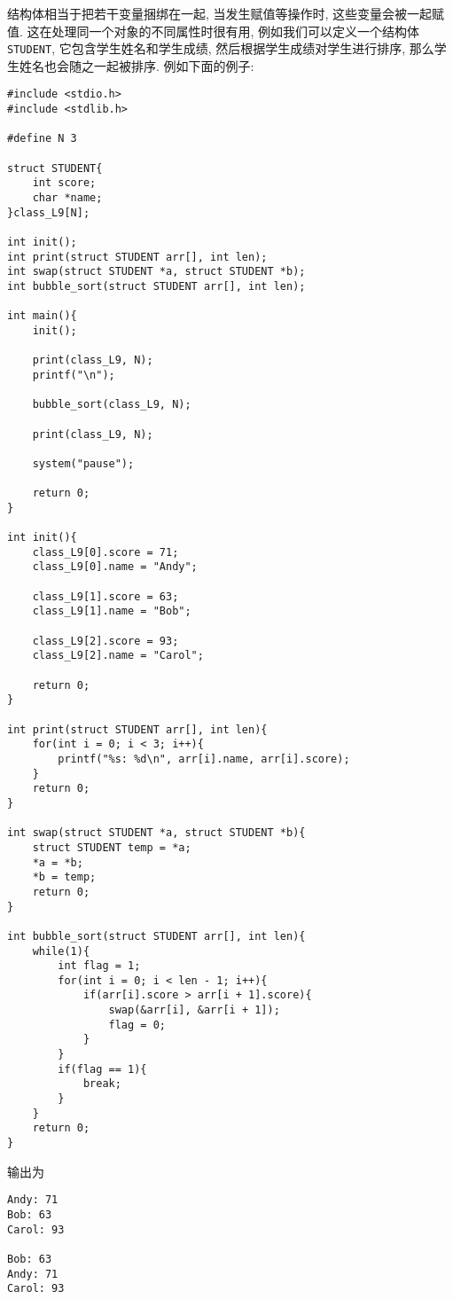     结构体相当于把若干变量捆绑在一起, 当发生赋值等操作时, 这些变量会被一起赋值. 这在处理同一个对象的不同属性时很有用, 例如我们可以定义一个结构体\texttt{STUDENT}, 它包含学生姓名和学生成绩, 然后根据学生成绩对学生进行排序, 那么学生姓名也会随之一起被排序. 例如下面的例子:
\begin{lstlisting}
#include <stdio.h>
#include <stdlib.h>

#define N 3

struct STUDENT{
    int score;
    char *name;
}class_L9[N];

int init();
int print(struct STUDENT arr[], int len);
int swap(struct STUDENT *a, struct STUDENT *b);
int bubble_sort(struct STUDENT arr[], int len);

int main(){
    init();

    print(class_L9, N);
    printf("\n");

    bubble_sort(class_L9, N);

    print(class_L9, N);

    system("pause");

    return 0;
}

int init(){
    class_L9[0].score = 71;
    class_L9[0].name = "Andy";

    class_L9[1].score = 63;
    class_L9[1].name = "Bob";

    class_L9[2].score = 93;
    class_L9[2].name = "Carol";

    return 0;
}

int print(struct STUDENT arr[], int len){
    for(int i = 0; i < 3; i++){
        printf("%s: %d\n", arr[i].name, arr[i].score);
    }
    return 0;
}

int swap(struct STUDENT *a, struct STUDENT *b){
    struct STUDENT temp = *a;
    *a = *b;
    *b = temp;
    return 0;
}

int bubble_sort(struct STUDENT arr[], int len){
    while(1){
        int flag = 1;
        for(int i = 0; i < len - 1; i++){
            if(arr[i].score > arr[i + 1].score){
                swap(&arr[i], &arr[i + 1]);
                flag = 0;
            }
        }
        if(flag == 1){
            break;
        }
    }
    return 0;
}
\end{lstlisting}
    输出为
\begin{lstlisting}
Andy: 71
Bob: 63
Carol: 93

Bob: 63
Andy: 71
Carol: 93
\end{lstlisting}


